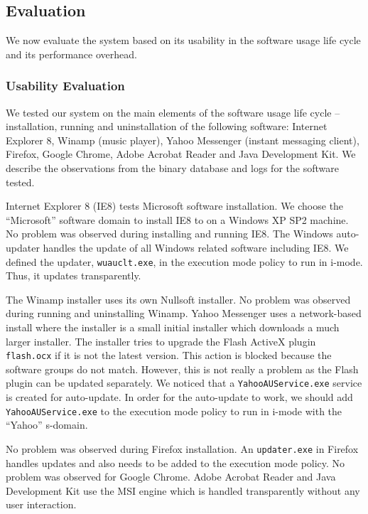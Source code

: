 \subsection{Evaluation}
\label{sec:binint-eval}

We now evaluate the system based on its usability in the software
usage life cycle and its performance overhead.

\subsubsection{Usability Evaluation}


We tested our system on the main elements of
the software usage life cycle -- installation,
running and uninstallation
of the following software: Internet Explorer 8, Winamp (music player),
Yahoo Messenger (instant messaging client),
Firefox, Google Chrome, Adobe Acrobat Reader and
Java Development Kit.
We describe the observations from the binary database and logs for the
software tested.

Internet Explorer 8 (IE8) tests Microsoft software installation.
We choose the ``Microsoft'' software domain to install IE8 to on a Windows XP
SP2 machine.
No problem was observed during installing and running IE8.
The Windows auto-updater handles the update of all Windows related software
including IE8.
We defined the updater, {\tt wuauclt.exe}, in the execution mode policy to run
in i-mode. Thus, it updates transparently.

The Winamp installer uses its own Nullsoft installer.
No problem was observed during running and uninstalling Winamp.
Yahoo Messenger uses a network-based install where the installer is a small
initial installer which downloads a much larger installer.
The installer tries to upgrade the Flash ActiveX plugin
{\tt flash.ocx} if it is not the latest version.
This action is blocked because the software groups do not match.
However, this is not really a problem as the Flash
plugin can be updated separately.
We noticed that a {\tt YahooAUService.exe} service is created
for auto-update.
In order for the auto-update to work, we should add {\tt YahooAUService.exe}
to the execution mode policy to run in i-mode with the
``Yahoo'' s-domain.

No problem was observed during Firefox installation.
An {\tt updater.exe} in Firefox handles updates and also needs to be
added to the execution mode policy.
No problem was observed for Google Chrome.
Adobe Acrobat Reader and Java Development Kit use the MSI engine
which is handled transparently without any user interaction.

